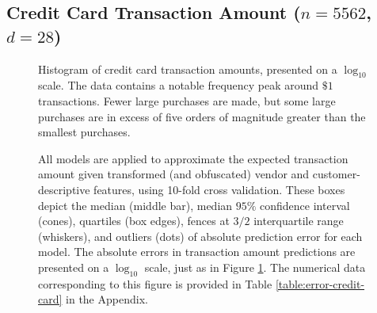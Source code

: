 \documentclass[smallextended,final]{svjour3}       %
\begin{document}
\subsection{Credit Card Transaction Amount ($n = 5562$, $d = 28$)}

\begin{figure}
  \centering
  \caption{Histogram of credit card transaction amounts, presented on a
  $\log_{10}$ scale. The data contains a notable frequency peak around
  $\$1$ transactions. Fewer large purchases are made, but some large
  purchases are in excess of five orders of magnitude greater than the
  smallest purchases.}

 \label{fig:hist-credit-card}
\end{figure}

\begin{figure}
  \centering
  \caption{All models are applied to approximate the expected transaction
  amount given transformed (and obfuscated) vendor and customer-descriptive
  features, using 10-fold cross validation.
  These boxes depict the median (middle bar), median
  $95\%$ confidence interval (cones), quartiles (box edges), fences at
  $3/2$ interquartile range (whiskers), and outliers (dots) of absolute
  prediction error for each model. The absolute errors in transaction
  amount predictions are presented on a $\log_{10}$ scale, just as in
  Figure \ref{fig:hist-credit-card}. The numerical data corresponding to
  this figure is provided in Table \ref{table:error-credit-card} in the
  Appendix.}

 \label{fig:error-credit-card}
\end{figure}
\end{document}
